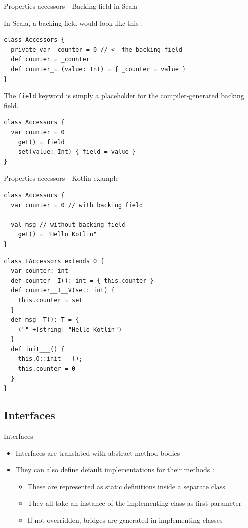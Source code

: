 \documentclass[10pt]{beamer}
\newcommand{\inlinecode}[2]{\colorbox{minted-bg}{\lstinline[language=#1]$#2$}}
\newcommand{\ktinline}[1]{\inlinecode{kotlin}{#1}}
\begin{document}
\begin{frame}[fragile]{Properties accessors - Backing field in Scala}
  
  In Scala, a backing field would look like this : 
  
  \begin{verbatim}
class Accessors {
  private var _counter = 0 // <- the backing field
  def counter = _counter
  def counter_= (value: Int) = { _counter = value }
}
  \end{verbatim}

  The \ktinline{field} keyword is simply a placeholder for the compiler-generated backing field.
  
  \begin{verbatim}
class Accessors {
  var counter = 0
    get() = field
    set(value: Int) { field = value }
}
  \end{verbatim}

\end{frame}

\begin{frame}[fragile]{Properties accessors - Kotlin example}

  \begin{verbatim}
class Accessors {
  var counter = 0 // with backing field

  val msg // without backing field
    get() = "Hello Kotlin"
}
  \end{verbatim}
  \begin{verbatim}
class LAccessors extends O {
  var counter: int
  def counter__I(): int = { this.counter }
  def counter__I__V(set: int) {
    this.counter = set
  }
  def msg__T(): T = {
    ("" +[string] "Hello Kotlin")
  }
  def init___() {
    this.O::init___();
    this.counter = 0
  }
}
  \end{verbatim}
\end{frame}


\subsection{Interfaces}


\begin{frame}{Interfaces}
 \begin{itemize}
  \item Interfaces are translated with abstract method bodies
  \item They can also define default implementations for their methods :
    \begin{itemize}
     \item These are represented as static definitions inside a separate class
     \item They all take an instance of the implementing class as first parameter
     \item If not overridden, bridges are generated in implementing classes
    \end{itemize}
 \end{itemize}
\end{frame}
\end{document}
